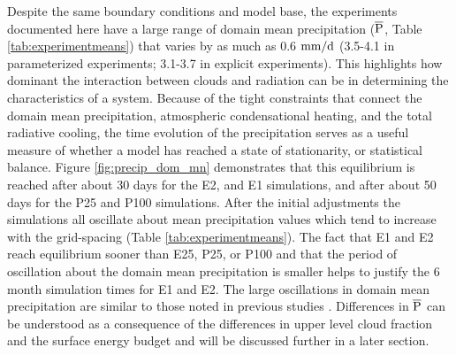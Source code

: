 \documentclass[draft]{agujournal2019}
\begin{document}
Despite the same boundary conditions and model base, the experiments documented here have a
large range of domain mean precipitation ($\rm{\overline{P}}$, Table \ref{tab:experimentmeans}) that varies by as much as 
0.6 $\rm{mm/d}$ (3.5-4.1 in parameterized experiments; 3.1-3.7 in explicit experiments).
This highlights how dominant the interaction between clouds and radiation can be in determining the 
characteristics of a system.
Because of the tight constraints that connect the domain mean precipitation, atmospheric condensational heating, and 
the total radiative cooling, the time evolution of the precipitation serves as a useful measure of whether a model has 
reached a state of stationarity, or statistical balance.  Figure \ref{fig:precip_dom_mn} demonstrates that this equilibrium is reached after about 30 
days for the E2, and E1 simulations, and after about 50 days for the P25 and P100 simulations.   After the initial adjustments
the simulations all oscillate about mean precipitation values which tend to increase with the grid-spacing 
(Table \ref{tab:experimentmeans}).   The fact that E1 and E2 reach equilibrium sooner than E25, P25, or P100 and that the period of oscillation 
about the domain mean precipitation is smaller helps to justify the 6 month simulation times for E1 and E2.  
The large oscillations in domain mean precipitation are similar to those noted in previous studies 
\cite{Silvers2016, Patrizio2019}.
Differences in $\rm{\overline{P}}$ can be understood as a consequence of the differences in upper level cloud fraction 
and the surface energy budget and will be discussed further in a later section.   
\end{document}
